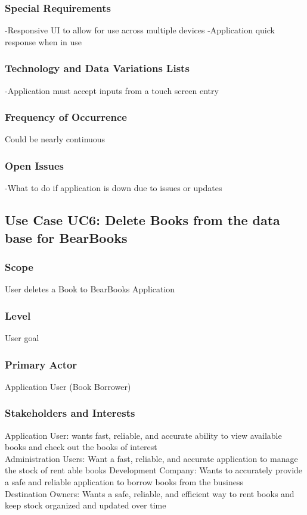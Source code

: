 \documentclass{article}
\begin{document}
	\subsubsection{\textbf{Special Requirements}}
	-Responsive UI to allow for use across multiple devices
	-Application quick response when in use
	\subsubsection{\textbf{Technology and Data Variations Lists}}
	-Application must accept inputs from a touch screen entry
	\subsubsection{\textbf{Frequency of Occurrence}}
	Could be nearly continuous
	\subsubsection{\textbf{Open Issues}}
	-What to do if application is down due to issues or updates
	
	\subsection{Use Case UC6: Delete Books from the data base for BearBooks}
	
	\subsubsection{\textbf{Scope}} 
	User deletes a Book to BearBooks Application
	\subsubsection{\textbf{Level}} 
	User goal
	\subsubsection{\textbf{Primary Actor}} 
	Application User (Book Borrower)
	\subsubsection{\textbf{Stakeholders and Interests}}
	Application User: wants fast, reliable, and accurate ability to view available books and check out the books of interest \\
	Administration Users: Want a fast, reliable, and accurate application to manage the stock of rent able books
	Development Company: Wants to accurately provide a safe and reliable application to borrow books from the business \\
	Destination Owners: Wants a safe, reliable, and efficient way to rent books and keep stock organized and updated over time \\
\end{document}
